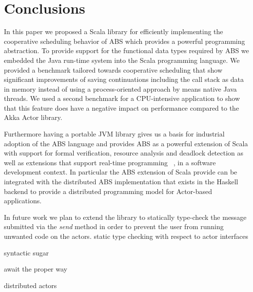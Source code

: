 \section{Conclusions}
\label{conc}
In this paper we proposed a Scala library for efficiently implementing the cooperative scheduling behavior of ABS which provides a powerful programming abstraction. 
To provide support for the functional data types required by ABS we embedded the Java run-time system into the Scala programming language. 
We provided a benchmark tailored towards cooperative scheduling that show significant improvements of saving continuations including the call stack as data in memory instead of using a process-oriented approach by means native Java threads. 
We used a second benchmark for a CPU-intensive application to show that this feature does have a negative impact on performance compared to the Akka Actor library.

\par Furthermore having a portable JVM library gives us a basis for industrial adoption of the ABS language and provides ABS as a powerful extension of Scala with support for formal verification, resource analysis and deadlock detection as well as extensions that support real-time programming ~\cite{rabs}, in a software development context. In particular the ABS extension of Scala provide can be integrated with the distributed ABS implementation that exists in the Haskell backend \cite{cloud} to provide a distributed programming model for Actor-based applications.

In future work we plan to extend the library to statically type-check the message submitted via the \textit{send} method in order to prevent the user from running unwanted code on the actors. 
static type checking with respect to actor interfaces

syntactic sugar 

await the proper way

distributed actors




